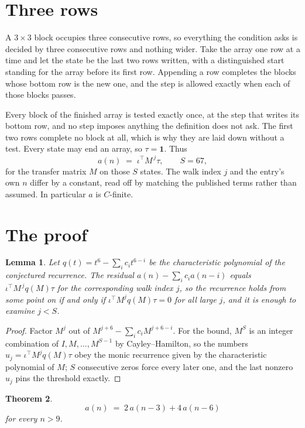 \documentclass[11pt,a4paper]{article}
\theoremstyle{plain}
\newtheorem{theorem}{Theorem}
\newtheorem{lemma}[theorem]{Lemma}
\theoremstyle{definition}
\begin{document}
\section{Three rows}

A $3\times3$ block occupies three consecutive rows, so everything the condition asks is decided
by three consecutive rows and nothing wider. Take the array one row at a time and let the state
be the last two rows written, with a distinguished start standing for the array before its
first row. Appending a row completes the blocks whose bottom row is the new one, and the step
is allowed exactly when each of those blocks passes.

Every block of the finished array is tested exactly once, at the step that writes its bottom
row, and no step imposes anything the definition does not ask. The first two rows complete no
block at all, which is why they are laid down without a test. Every state may end an array, so
$\tau=\mathbf{1}$. Thus
\[
a(n)\;=\;\iota^{\!\top}M^{\,j}\tau ,\qquad S=67,
\]
for the transfer matrix $M$ on those $S$ states. The walk index $j$ and the entry's own $n$
differ by a constant, read off by matching the published terms rather than assumed. In
particular $a$ is $C$-finite.

\section{The proof}

\begin{lemma}\label{lem:crit}
Let $q(t)=t^{6}-\sum_i c_it^{6-i}$ be the characteristic polynomial of the
conjectured recurrence. The residual $a(n)-\sum_ic_ia(n-i)$ equals
$\iota^{\!\top}M^{\,j}q(M)\tau$ for the corresponding walk index $j$, so the recurrence
holds from some point on if and only if $\iota^{\!\top}M^{j}q(M)\tau=0$ for all large $j$,
and it is enough to examine $j<S$.
\end{lemma}

\begin{proof}
Factor $M^{j}$ out of $M^{j+6}-\sum_ic_iM^{j+6-i}$. For the bound, $M^{S}$
is an integer combination of $I,M,\dots,M^{S-1}$ by Cayley--Hamilton, so the numbers
$u_j=\iota^{\!\top}M^{j}q(M)\tau$ obey the monic recurrence given by the characteristic
polynomial of $M$; $S$ consecutive zeros force every later one, and the last nonzero $u_j$
pins the threshold exactly.
\end{proof}

\begin{theorem}
\[
a(n)\;=\;2\,a(n-3) + 4\,a(n-6)
\]
for every $n>9$.
\end{theorem}
\end{document}

